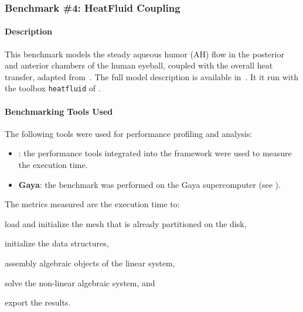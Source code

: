 \subsubsection{Benchmark \#4: HeatFluid Coupling}
\label{sec:WP1:Feelpp:benchmark4}

\newcommand{\vct}[1]{\vec{#1}}
\newcommand{\mat}[1]{\underline{\underline{#1}}}





\paragraph{Description}
This benchmark models the steady aqueous humor (AH) flow in the posterior and anterior chambers of the human eyeball, coupled with the overall heat transfer, adapted from~\cite{ooi_simulation_2008,kilgour_operator_2021}.
The full model description is available in~\cite{saigre_coupled_2024_abstract}.
It it run with the toolbox \texttt{heatfluid} of \Feelpp.


\paragraph{Benchmarking Tools Used}

The following tools were used for performance profiling and analysis:
\begin{itemize}
    \item \textbf{\Feelpp}: the performance tools integrated into the \Feelpp framework were used to measure the execution time.
    \item \textbf{Gaya}: the benchmark was performed on the Gaya supercomputer (see ).
\end{itemize}

The metrics measured are the execution time to:
\begin{inparaenum}[\it (i)]
    \item load and initialize the mesh that is already partitioned on the disk,
    \item initialize the data structures,
    \item assembly algebraic objects of the linear system,
    \item solve the non-linear algebraic system, and
    \item export the results.
\end{inparaenum}


